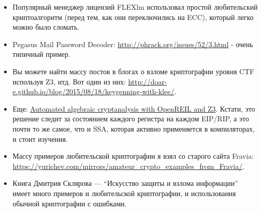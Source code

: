 \begin{itemize}

\item Популярный менеджер лицензий FLEXlm использовал простой любительский криптоалгоритм
(перед тем, как они переключились на \ac{ECC}), который легко можно было сломать.

\item Pegasus Mail Password Decoder: \url{http://phrack.org/issues/52/3.html} -
очень типичный пример.

\item Вы можете найти массу постов в блогах о взломе криптографии уровня \ac{CTF} используя Z3, итд.
Вот один из них: \url{http://doar-e.github.io/blog/2015/08/18/keygenning-with-klee/}.

\item Еще: \href{http://blog.cr4.sh/2015/03/automated-algebraic-cryptanalysis-with.html}{Automated algebraic cryptanalysis with OpenREIL and Z3}.
Кстати, это решение следит за состоянием каждого регистра на каждом EIP/RIP, а это почти то же самое, что и \ac{SSA},
которая активно применяется в компиляторах, и стоит изучения.

\item Массу примеров любительской криптографии я взял со старого сайта Fravia:
\url{https://yurichev.com/mirrors/amateur_crypto_examples_from_Fravia/}.

\item Книга Дмитрия Склярова --- ``Искусство защиты и взлома информации'' имеет много примеров и любительской криптографии,
и использования обычной криптографии с ошибками.

\end{itemize}



